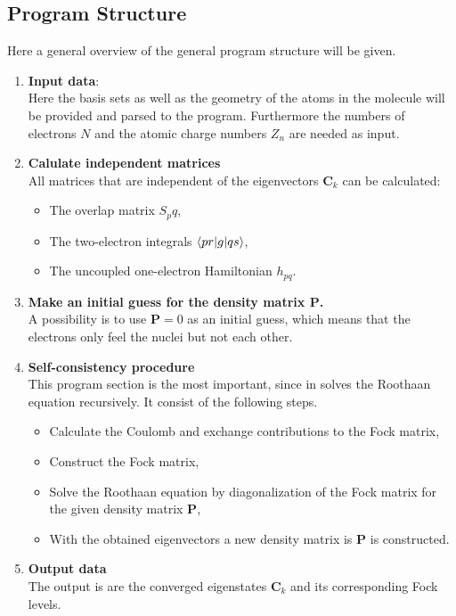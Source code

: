 \documentclass[twoside,        %
			   11pt,			%
               BCOR10mm,       %
               ngerman,english  %
               ]{scrartcl}
\begin{document}
    
\subsection{Program Structure}
Here a general overview of the general program structure will be given.

\begin{enumerate}
	\item \textbf{Input data}:\\
	Here the basis sets as well as the geometry of the atoms in the molecule will be provided and parsed to the program. Furthermore the numbers of electrons $N$ and the atomic charge numbers $Z_n$ are needed as input.
	\item \textbf{Calulate independent matrices}\\
	All matrices that are independent of the eigenvectors $\mathbf{C}_k$ can be calculated:
	\begin{itemize}
		\item The overlap matrix $S_pq$,
		\item The two-electron integrals $\braket{pr|g|qs}$,
		\item The uncoupled one-electron Hamiltonian $h_{pq}$.
	\end{itemize}
	\item \textbf{Make an initial guess for the density matrix $\mathbf{P}$.}\\
	A possibility is to use $\mathbf{P} = 0$ as an initial guess, which means that the electrons only feel the nuclei but not each other.
	\item \textbf{Self-consistency procedure}\\
	This program section is the most important, since in solves the Roothaan equation recursively. It consist of the following steps.
	\begin{itemize}
		\item Calculate the Coulomb and exchange contributions to the Fock matrix,
		\item Construct the Fock matrix,
		\item Solve the Roothaan equation by diagonalization of the Fock matrix for the given density matrix $\mathbf{P}$,
		\item With the obtained eigenvectors a new density matrix is $\mathbf{P}$ is constructed.
	\end{itemize}
	\item \textbf{Output data}\\
	The output is are the converged eigenstates $\mathbf{C}_k$ and its corresponding Fock levels.
\end{enumerate}
\end{document}

